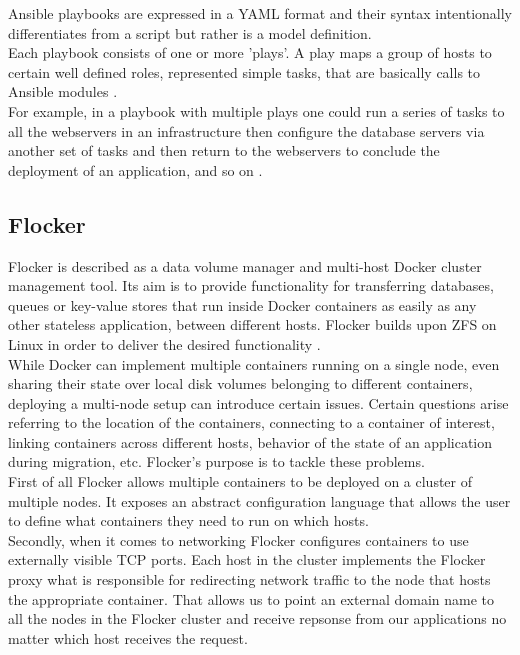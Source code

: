 \documentclass{article}
\begin{document}
Ansible playbooks are expressed in a YAML format and their syntax intentionally differentiates from a script but rather is a model definition.\\
Each playbook consists of one or more 'plays'. A play maps a group of hosts to certain well defined roles, represented simple tasks, that are basically calls to Ansible modules \cite{ansible-playbooks}. \\
For example, in a playbook with multiple plays one could run a series of tasks to all the webservers in an infrastructure then configure the database servers via another set of tasks and then return to the webservers to conclude the deployment of an application, and so on \cite{ansible-playbooks}.


\subsection{Flocker}
Flocker is described as a data volume manager and multi-host Docker cluster management tool. Its aim is to provide functionality for transferring databases, queues or key-value stores that run inside Docker containers as easily as any other stateless application, between different hosts. Flocker builds upon ZFS on Linux in order to deliver the desired functionality \cite{flocker-intro}.\\
While Docker can implement multiple containers running on a single node, even sharing their state over local disk volumes belonging to different containers, deploying a multi-node setup can introduce certain issues. Certain questions arise referring to the location of the containers, connecting to a container of interest, linking containers across different hosts, behavior of the state of an application during migration, etc. Flocker's purpose is to tackle these problems\cite{flocker-docks}.\\
First of all Flocker allows multiple containers to be deployed on a cluster of multiple nodes. It exposes an abstract configuration language that allows the user to define what containers they need to run on which hosts\cite{flocker-docks}.\\
Secondly, when it comes to networking Flocker configures containers to use externally visible TCP ports. Each host in the cluster implements the Flocker proxy what is responsible for redirecting network traffic to the node that hosts the appropriate container. That allows us to point an external domain name to all the nodes in the Flocker cluster and receive repsonse from our applications no matter which host receives the request\cite{flocker-docks}.\\
\end{document}
